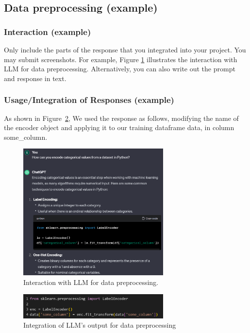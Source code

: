 \subsection{Data preprocessing (example)}

\subsubsection{Interaction (example)}
Only include the parts of the response that you integrated into your project. You may submit screenshots. For example, Figure \ref{fig:llm-output} illustrates the interaction with LLM for data preprocessing. 
Alternatively, you can also write out the prompt and response in text.


\subsubsection{Usage/Integration of Responses (example)}

As shown in Figure~\ref{fig:data-prep-integration}, We used the response as follows, modifying the name of the encoder object and applying it to our training dataframe data, in column some\_column. 

\begin{figure}[htbp]
\centering
\includegraphics[width=0.68\textwidth]{figs/llm_report_1.png}
    \caption{Interaction with LLM for data preprocessing. }
    \label{fig:llm-output}
\end{figure}

\begin{figure}[t]
    \centering
\includegraphics[width=0.68\textwidth]{figs/llm_report_2.png}
    \caption{Integration of LLM's output for data preprocessing}
\label{fig:data-prep-integration}
\end{figure}



